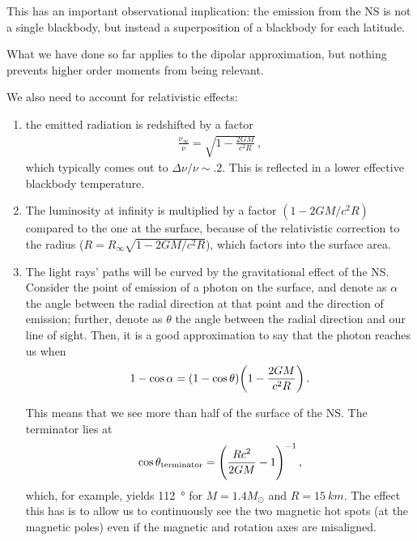 \documentclass[main.tex]{subfiles}
\begin{document}
This has an important observational implication: the emission from the NS is not a single blackbody, but instead a superposition of a blackbody for each latitude.

What we have done so far applies to the dipolar approximation, but nothing prevents higher order moments from being relevant. 

We also need to account for relativistic effects: 
\begin{enumerate}
    \item the emitted radiation is redshifted by a factor 
    \begin{align}
    \frac{\nu _\infty}{\nu } = \sqrt{1 - \frac{2GM}{c^2R}} 
    \,,
    \end{align}
    which typically comes out to \(\Delta \nu / \nu \sim \num{.2}\). This is reflected in a lower effective blackbody temperature.
    \item The luminosity at infinity is multiplied by a factor \((1 - 2GM/c^2R)\) compared to the one at the surface, because of the relativistic correction to the radius (\(R = R_\infty \sqrt{1 - 2GM/c^2R}\)), which factors into the surface area. 
    \item The light rays' paths will be curved by the gravitational effect of the NS. Consider the point of emission of a photon on the surface, and denote as \(\alpha \) the angle between the radial direction at that point and the direction of emission; further, denote as \(\theta \) the angle between the radial direction and our line of sight. Then, it is a good approximation to say that the photon reaches us when \cite[]{beloborodovGravitationalBendingLight2002}
    \begin{align}
    1 - \cos \alpha = (1 - \cos \theta ) \qty(1 - \frac{2GM}{c^2R})
    \,.
    \end{align}
    
    This means that we see more than half of the surface of the NS. The terminator lies at 
    \begin{align}
    \cos \theta  _{\text{terminator}} = \qty( \frac{Rc^2}{2GM} -1 )^{-1}
    \,,
    \end{align}
    which, for example, yields \SI{112}{\degree} for \(M = \num{1.4} M_{\odot}\) and \(R = \SI{15}{km}\). 
    The effect this has is to allow us to continuously see the two magnetic hot spots (at the magnetic poles) even if the magnetic and rotation axes are misaligned.
\end{enumerate}
\end{document}
